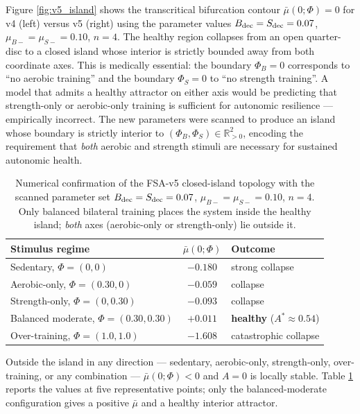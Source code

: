 Figure \ref{fig:v5_island} shows the transcritical bifurcation contour $\bar\mu(0;\Phi) = 0$ for v4 (left) versus v5 (right) using the parameter values $B_{\rm dec} = S_{\rm dec} = 0.07$, $\mu_{B-} = \mu_{S-} = 0.10$, $n = 4$. The healthy region collapses from an open quarter-disc to a closed island whose interior is strictly bounded away from both coordinate axes. This is medically essential: the boundary $\Phi_B = 0$ corresponds to ``no aerobic training'' and the boundary $\Phi_S = 0$ to ``no strength training''. A model that admits a healthy attractor on either axis would be predicting that strength-only or aerobic-only training is sufficient for autonomic resilience --- empirically incorrect. The new parameters were scanned to produce an island whose boundary is strictly interior to $(\Phi_B, \Phi_S) \in \mathbb{R}_{>0}^2$, encoding the requirement that \emph{both} aerobic and strength stimuli are necessary for sustained autonomic health.

\begin{table}[h]
\centering
\small
\begin{tabular}{lcl}
\toprule
Stimulus regime & $\bar\mu(0;\Phi)$ & Outcome \\
\midrule
Sedentary, $\Phi = (0, 0)$               & $-0.180$ & strong collapse \\
Aerobic-only, $\Phi = (0.30, 0)$         & $-0.059$ & collapse \\
Strength-only, $\Phi = (0, 0.30)$        & $-0.093$ & collapse \\
Balanced moderate, $\Phi = (0.30, 0.30)$ & $+0.011$ & \textbf{healthy} ($A^* \approx 0.54$) \\
Over-training, $\Phi = (1.0, 1.0)$       & $-1.608$ & catastrophic collapse \\
\bottomrule
\end{tabular}
\caption{Numerical confirmation of the FSA-v5 closed-island topology with the scanned parameter set $B_{\rm dec} = S_{\rm dec} = 0.07$, $\mu_{B-} = \mu_{S-} = 0.10$, $n = 4$. Only balanced bilateral training places the system inside the healthy island; \emph{both} axes (aerobic-only or strength-only) lie outside it.}
\label{tab:v5_island_check}
\end{table}

Outside the island in any direction --- sedentary, aerobic-only, strength-only, over-training, or any combination --- $\bar\mu(0;\Phi) < 0$ and $A = 0$ is locally stable. Table \ref{tab:v5_island_check} reports the values at five representative points; only the balanced-moderate configuration gives a positive $\bar\mu$ and a healthy interior attractor.

